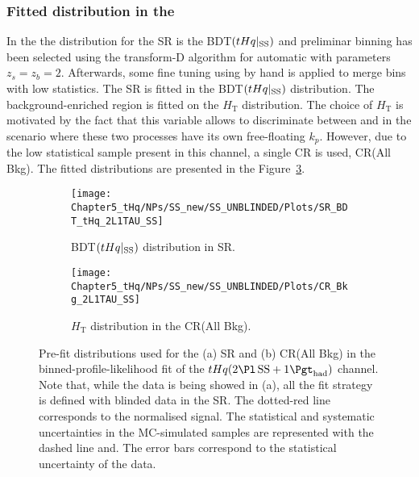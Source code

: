 \subsubsection{Fitted distribution in the \dilepSStau}
\label{sec:ChaptH:Fit:Distributions:SS}
In the \dilepSStau the distribution for the SR is the BDT$(tHq|_{\text{SS}})$ and preliminar binning has
been selected using the transform-D algorithm for automatic with parameters $z_{s} = z_{b} = 2$. 
Afterwards, some fine tuning using by hand is applied to merge bins with low statistics. 
The SR is fitted in the BDT$(tHq|_{\text{SS}})$ distribution. The background-enriched region
is fitted on the $H_{\text{T}}$ distribution. The choice of $H_{\text{T}}$ is motivated by the fact that
this variable allows to discriminate between \ttbar and \ttX in the scenario where these two
processes have its own free-floating $k_p$.  However, due to the low statistical sample present
in this channel, a single CR is used, CR(All Bkg). The fitted distributions are presented in
the Figure~\ref{fig:ChaptH:PreFit:SS:SR_CR}.

\begin{figure}[h]
\centering
\begin{subfigure}{.5\textwidth}
  \centering
  \texttt{[image: Chapter5\_tHq/NPs/SS\_new/SS\_UNBLINDED/Plots/SR\_BDT\_tHq\_2L1TAU\_SS]}
  \caption{BDT$(tHq|_{\text{SS}})$ distribution in SR.}
  \label{fig:ChaptH:PreFit:SS:SR}
\end{subfigure}%
\hfill
\begin{subfigure}{.5\textwidth}
  \centering
  \texttt{[image: Chapter5\_tHq/NPs/SS\_new/SS\_UNBLINDED/Plots/CR\_Bkg\_2L1TAU\_SS]}
  \caption{$H_{\text{T}}$ distribution in the CR(All Bkg).}
  \label{fig:ChaptH:PreFit:SS:CR}
\end{subfigure}%
\caption{Pre-fit distributions used for the (a) \tHq SR and (b) CR(All Bkg) in the
binned-profile-likelihood fit of the $\tHq(\dilepSStau)$ channel.
Note that, while the data is being showed in (a), all the fit strategy is defined with blinded data in the SR.
The dotted-red line corresponds to the normalised \tHq signal.
The statistical and systematic uncertainties in the MC-simulated samples are represented with the dashed line
and. The error bars correspond to the statistical uncertainty of the data.}
\label{fig:ChaptH:PreFit:SS:SR_CR}
\end{figure}




